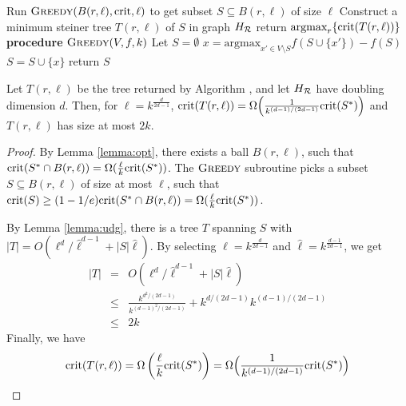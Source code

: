 \begin{algorithm}{}
\caption{\small $\algosubmod(H_{\R}, k, \ell)$}
\label{alg:algosubmod}
\begin{algorithmic}[1]
\begin{small}
  \STATE 
Run $\textsc{Greedy}(B(r, \ell), \text{crit}, \ell)$ to get subset $S\subseteq B(r, \ell)$ of size $\ell$
  \STATE Construct a minimum steiner tree $T(r, \ell)$ of $S$ in graph $H_{\mathcal{R}}$
\ENDFOR
\STATE return $\mbox{argmax}_{r} \{\text{crit}(T(r, \ell))\}$
\STATE
\STATE\textbf{procedure} $\textsc{Greedy}(V, f, k)$ \cite{nemhauser1978analysis}
\STATE Let $S = \emptyset$
\STATE $x = \mbox{argmax}_{x' \in V\setminus S} f(S \cup \{x'\}) - f(S)$
\STATE $S = S \cup \{x\}$
\ENDFOR
\STATE return $S$
\end{small}
\end{algorithmic}
\end{algorithm}

\begin{theorem}
\label{theorem:submod}
Let $T(r, \ell)$ be the tree returned by Algorithm \algosubmod{}, and let $H_{\mathcal{R}}$ have doubling dimension $d$. Then, for $\ell=k^{\frac{d}{2d-1}}$, $\text{crit}(T(r, \ell))=\Omega\Big(\frac{1}{k^{(d-1)/(2d-1)}} \text{crit}(S^*)\Big)$ and $T(r, \ell)$ has size at most $2k$.
\end{theorem}
\begin{proof}
By Lemma \ref{lemma:opt}, there exists a ball $B(r, \ell)$, such that $\text{crit}(S^*\cap B(r, \ell))=\Omega(\frac{\ell}{k}\text{crit}(S^*))$.
The $\textsc{Greedy}$ subroutine picks a subset $S\subseteq B(r, \ell)$ of size at most $\ell$, such that $\text{crit}(S)\geq(1-1/e) \text{crit}(S^*\cap B(r, \ell)) = \Omega(\frac{\ell}{k} \text{crit}(S^*))$.

By Lemma \ref{lemma:udg}, there is a tree $T$ spanning $S$ with $|T|=O(\ell^d/\hat{\ell}^{d-1}+|S|\hat{\ell})$.
By selecting $\ell=k^{\frac{d}{2d-1}}$ and $\hat{\ell}=k^{\frac{d-1}{2d-1}}$, we get
\begin{eqnarray*}
|T| &=&O(\ell^d/\hat{\ell}^{d-1}+|S|\hat{\ell})\\
&\leq& \frac{k^{d^2/(2d-1)}}{k^{(d-1)^2/(2d-1)}} + k^{d/(2d-1)}k^{(d-1)/(2d-1)}\\
&\leq& 2k
\end{eqnarray*}
Finally, we have 
\[
\text{crit}(T(r, \ell))=\Omega\left(\frac{\ell}{k}\text{crit}(S^*)\right) = \Omega\Big(\frac{1}{k^{(d-1)/(2d-1)}} \text{crit}(S^*)\Big)
\]
\end{proof}

